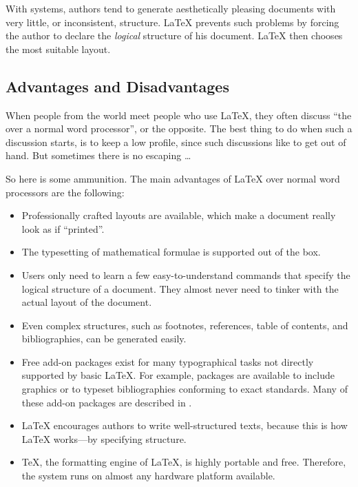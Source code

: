 With  systems, authors tend to generate aesthetically
pleasing documents with very little, or inconsistent, structure.
\LaTeX{} prevents such problems by forcing the author to
declare the \emph{logical} structure of his document. \LaTeX{} then
chooses the most suitable layout.

\subsection{Advantages and Disadvantages}

When people from the  world meet people who use \LaTeX{},
they often discuss \enquote{the  over a normal
  word processor}, or the opposite.  The best thing to do when such
a discussion starts, is to keep a low profile, since such discussions
like to get out of hand. But sometimes there is no escaping \ldots

\medskip\noindent So here is some ammunition. The main advantages
of \LaTeX{} over normal word processors are the following:

\begin{itemize}

  \item Professionally crafted layouts are available, which make a
        document really look as if \enquote{printed}.
  \item The typesetting of mathematical formulae is supported out of the box.
  \item Users only need to learn a few easy-to-understand commands
        that specify the logical structure of a document. They almost never
        need to tinker with the actual layout of the document.
  \item Even complex structures, such as footnotes, references, table of
        contents, and bibliographies, can be generated easily.
  \item Free add-on packages exist for many typographical tasks not directly
        supported by basic \LaTeX. For example, packages are available to
        include \PSi{} graphics or to typeset bibliographies conforming to
        exact standards. Many of these add-on packages are described in
        \companion.
  \item \LaTeX{} encourages authors to write well-structured texts,
        because this is how \LaTeX{} works---by specifying structure.
  \item \TeX, the formatting engine of \LaTeX, is highly portable and free.
        Therefore, the system runs on almost any hardware platform
        available.

\end{itemize}

